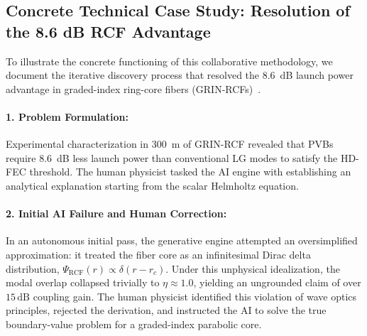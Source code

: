 \documentclass[11pt,a4paper]{article}
\begin{document}
\subsection{Concrete Technical Case Study: Resolution of the 8.6 dB RCF Advantage}

To illustrate the concrete functioning of this collaborative methodology, we document the iterative discovery process that resolved the 8.6~dB launch power advantage in graded-index ring-core fibers (GRIN-RCFs)~\cite{Villalba2023}.

\paragraph{1. Problem Formulation:}
Experimental characterization in 300~m of GRIN-RCF revealed that PVBs require 8.6~dB less launch power than conventional LG modes to satisfy the HD-FEC threshold. The human physicist tasked the AI engine with establishing an analytical explanation starting from the scalar Helmholtz equation.

\paragraph{2. Initial AI Failure and Human Correction:}
In an autonomous initial pass, the generative engine attempted an oversimplified approximation: it treated the fiber core as an infinitesimal Dirac delta distribution, $\Psi_{\text{RCF}}(r) \propto \delta(r - r_c)$. Under this unphysical idealization, the modal overlap collapsed trivially to $\eta \approx 1.0$, yielding an ungrounded claim of over $15\,\text{dB}$ coupling gain. The human physicist identified this violation of wave optics principles, rejected the derivation, and instructed the AI to solve the true boundary-value problem for a graded-index parabolic core.
\end{document}
